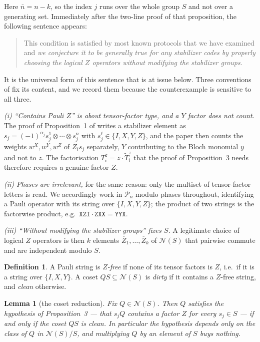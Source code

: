 \documentclass[11pt]{amsart}
\newtheorem{lemma}[theorem]{Lemma}
\theoremstyle{remark}
\theoremstyle{definition}
\newtheorem{definition}[theorem]{Definition}
\newcommand{\PP}{\mathcal P}
\newcommand{\NN}{\mathcal N}
\newcommand{\Zb}{\overline Z}
\newcommand{\str}[1]{\texttt{#1}}
\begin{document}
Here $\bar n=n-k$, so the index $j$ runs over the whole group $S$ and not over a generating set.
Immediately after the two-line proof of that proposition, the following sentence appears:

\begin{quote}
This condition is satisfied by most known protocols that we have examined and \emph{we conjecture it
to be generally true for any stabilizer codes by properly choosing the logical $Z$ operators without
modifying the stabilizer groups.}
\end{quote}

It is the universal form of this sentence that is at issue below. Three conventions of \cite{ZL} fix
its content, and we record them because the counterexample is sensitive to all three.

\smallskip\noindent\emph{(i) ``Contains Pauli $Z$'' is about tensor-factor type, and a $Y$ factor
does not count.} The proof of Proposition~1 of \cite{ZL} writes a stabilizer element as
$s_j=(-1)^{\alpha_j}s_j^1\otimes\cdots\otimes s_j^n$ with $s_j^\ell\in\{I,X,Y,Z\}$, and the paper
then counts the weights $w^X,w^Y,w^Z$ of $\Zb_is_j$ separately, $Y$ contributing to the Bloch
monomial $y$ and not to $z$. The factorisation $T^z_i=z\cdot\widetilde T^z_i$ that the proof of
Proposition~3 needs therefore requires a genuine factor $Z$.

\smallskip\noindent\emph{(ii) Phases are irrelevant,} for the same reason: only the multiset of
tensor-factor letters is read. We accordingly work in $\PP_n$ modulo phases throughout, identifying
a Pauli operator with its string over $\{I,X,Y,Z\}$; the product of two strings is the factorwise
product, e.g.\ $\str{XZI}\cdot\str{ZXX}=\str{YYX}$.

\smallskip\noindent\emph{(iii) ``Without modifying the stabilizer groups'' fixes $S$.} A legitimate
choice of logical $Z$ operators is then $k$ elements $\Zb_1,\dots,\Zb_k$ of $\NN(S)$ that pairwise
commute and are independent modulo $S$.

\begin{definition}\label{def:clean}
A Pauli string is \emph{$Z$-free} if none of its tensor factors is $Z$, i.e.\ if it is a string over
$\{I,X,Y\}$. A coset $QS\subseteq\NN(S)$ is
\emph{dirty} if it contains a $Z$-free string, and \emph{clean} otherwise.
\end{definition}

\begin{lemma}[the coset reduction]\label{lem:coset}
Fix $Q\in\NN(S)$. Then $Q$ satisfies the hypothesis of Proposition~3 --- that $s_jQ$ contains a
factor $Z$ for every $s_j\in S$ --- if and only if the coset $QS$ is clean. In particular the
hypothesis depends only on the class of $Q$ in $\NN(S)/S$, and multiplying $Q$ by an element of $S$
buys nothing.
\end{lemma}
\end{document}
